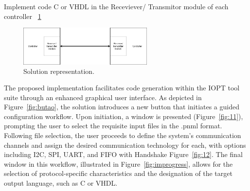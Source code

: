 Implement code C or VHDL in the Receviever/ Transmitor module of each controller ~\ref{fig:representation}
\begin{figure}[htbp]
  \centering
  \includegraphics[width=0.6\textwidth]{Chapters/Figures/Diagrama.png}
  \caption{Solution representation.}
  \label{fig:representation}
\end{figure}


The proposed implementation facilitates code generation within the IOPT tool suite through an enhanced graphical user interface. As depicted in Figure~\ref{fig:butao}, the solution introduces a new button that initiates a guided configuration workflow. Upon initiation, a window is presented (Figure~\ref{fig:11}), prompting the user to select the requisite input files in the .pnml format. Following file selection, the user proceeds to define the system's communication channels and assign the desired communication technology for each, with options including I2C, SPI, UART, and FIFO with Handshake Figure~\ref{fig:12}. The final window in this workflow, illustrated in Figure~\ref{fig:improgress}, allows for the selection of protocol-specific characteristics and the designation of the target output language, such as C or VHDL.


